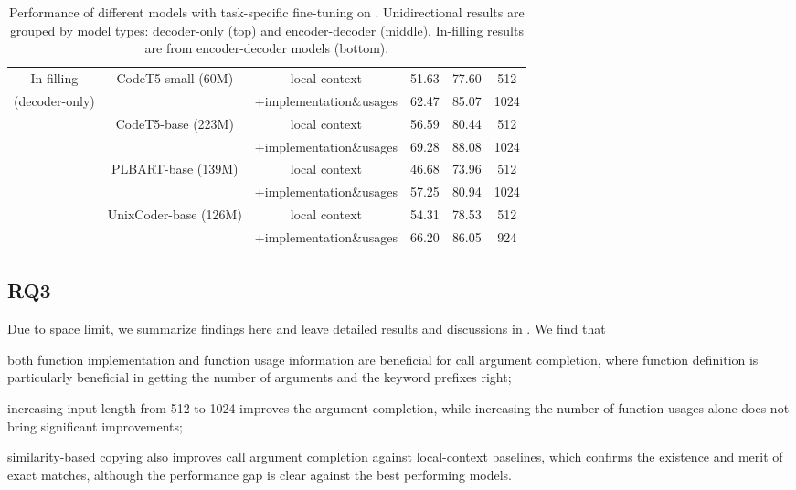 \begin{table*}[ht]
{\begin{tabular}{cccccc}
\midrule
In-filling & CodeT5-small (60M) & local context               & 51.63 & 77.60      & 512                 \\
(decoder-only)            &              & +implementation\&usages & 62.47 & 85.07     & 1024                 \\
           & CodeT5-base (223M) & local context               & 56.59 & 80.44     & 512                 \\
           &              & +implementation\&usages & 69.28 & 88.08     & 1024                 \\
           & PLBART-base (139M) & local context               & 46.68 & 73.96    & 512                 \\
           &              & +implementation\&usages & 57.25 & 80.94     & 1024                 \\        
           & UnixCoder-base (126M) & local context               & 54.31 & 78.53  & 512                 \\
           &              & +implementation\&usages & 66.20 & 86.05   & 924                 \\           
\bottomrule
\end{tabular}
}
\caption{Performance of different models with task-specific fine-tuning on \CallArgs.
Unidirectional results are grouped by model types: decoder-only (top) and encoder-decoder (middle).
In-filling results are from encoder-decoder models (bottom).
}
\label{tab:fc_all}
\end{table*}

\subsection{RQ3}
\label{sec:ablation-study}
\ifaaai

\fi
\ifamlc

Due to space limit, we summarize findings here and leave detailed results and discussions in .
We find that
\begin{enumerate*}[label=\itshape\roman*\upshape)]
    \item both function implementation and function usage information are beneficial for call argument completion, where function definition is particularly beneficial in getting the number of arguments and the keyword prefixes right;
    \item increasing input length from 512 to 1024 improves the argument completion, while increasing the number of function usages alone does not bring significant improvements;
    \item similarity-based copying also improves call argument completion against local-context baselines, which confirms the existence and merit of exact matches, although the performance gap is clear against the best performing models.
\end{enumerate*}

\fi